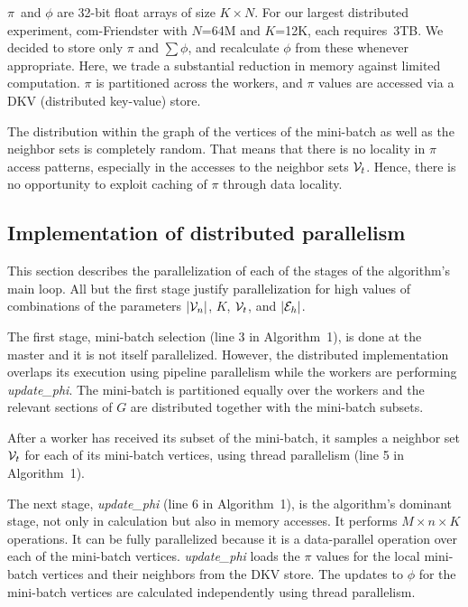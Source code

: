 $\pi$~and $\phi$ are 32-bit float arrays of size $K \times N$. For our
largest distributed experiment, com-Friendster with $N$=64M and $K$=12K, each
requires~3TB. We decided to store only $\pi$ and $\sum\phi$, and recalculate
$\phi$ from these whenever appropriate. Here, we trade a substantial reduction
in memory against limited computation. $\pi$ is partitioned across the workers,
and $\pi$ values are accessed via a DKV (distributed key-value) store.


The distribution within the graph of the vertices of the mini-batch as well as
the neighbor sets is completely random. That means that there is no locality
in $\pi$ access patterns, especially in the accesses to the neighbor sets
$\cV_t$.
Hence, there is no opportunity to exploit caching of $\pi$ through data
locality.


\subsection{Implementation of distributed parallelism}

This section describes the parallelization of each of the stages of the
algorithm's main loop. All but the first stage justify parallelization for
high values of combinations of the  parameters $|\cV_n|$, $K$, $\cV_t$, and $|\cE_h|$.

The first stage, mini-batch selection (line 3 in Algorithm~1), is done at the master and it is
not itself parallelized. However, the distributed implementation overlaps
its execution using pipeline parallelism while the workers are
performing \textit{update\_phi}. The mini-batch is partitioned equally over
the workers and the relevant sections of $G$ are distributed together with the
mini-batch subsets.

After a worker has received its subset of the mini-batch, it samples a neighbor
set $\cV_t$ for each of its mini-batch vertices, using thread parallelism
(line 5 in Algorithm~1).

The next stage, \textit{update\_phi} (line 6 in Algorithm~1), is the algorithm's dominant stage, not
only in calculation but also in memory accesses. It performs $M\times n\times
K$ operations. It can be fully parallelized because it is a data-parallel
operation over each of the mini-batch vertices. \textit{update\_phi} loads the
$\pi$ values for the local mini-batch vertices and their neighbors from the
DKV store. The updates to $\phi$ for the mini-batch vertices are calculated
independently using thread parallelism.

